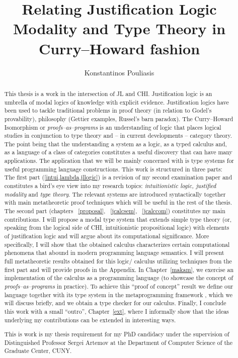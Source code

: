 \documentclass[12pt]{report}
\title{Relating Justification Logic Modality and Type Theory in Curry--Howard fashion}
\author{Konstantinos Pouliasis}
\begin{document}
\maketitle


\begin{abstract}
This thesis is a work in the intersection of \ac{JL} and \ac{CHI}. Justification logic is an umbrella of modal logics of knowledge with explicit evidence. 
Justification logics have been used to tackle traditional problems in proof theory (in relation to Godel's provability), philosophy (Gettier examples, Russel's barn paradox). 
The Curry--Howard Isomorphism or \emph{proofs--as--programs} is an understanding of logic that places logical studies in conjunction to type theory and -- in current developments -- 
category theory. The point being that the  understanding a system as a logic, as a typed calculus and, as a language of a class of categories constitutes a useful discovery 
that can have many applications.
The application that we will be mainly concerned with is type systems for useful programming language constructions. 
This work  is structured in three parts: 
The first part (\cref{intui,lambda,jllogic}) is a revision of my second examination paper and constitutes 
a bird's eye view into my 
research topics:  
\emph{intuitionistic logic, justified modality} and \emph{type theory}. 
The relevant systems are introduced syntactically together with main 
 metatheoretic proof techniques which will be useful 
in the rest of the thesis.
The second part (chapters ~\ref{proposal}, ~\ref{jcalcsem}, ~\ref{jcalccom}) 
constitutes my main contributions.
I will propose  
a modal type system that extends simple type theory
 (or, speaking from the logical side of \ac{CHI}, 
intuitionistic propositional logic) with elements of
 justification logic and will argue about its computational significance. 
 More specifically, I will show  
that the obtained calculus characterizes  certain 
computational phenomena that abound in modern programming language semantics. 
I will present full metatheoretic
results obtained for this logic/ calculus utilizing techniques from the first part 
and will provide proofs in the Appendix. 
In Chapter~\ref{makam}, we exercise an implementation of the calculus 
as a programming language (to showcase the concept of \emph{proofs--as--programs} in practice). To achieve this ``proof of concept'' result we define our 
language together with its type system
in the metaprogramming framework , which we will discuss briefly, 
and we obtain a type checker for our calculus. 
Finally, I conclude this work with a small ``outro'', Chapter~\ref{ext},
where I informally show that the ideas underlying my contributions 
can be extended in interesting ways.

This is work is my thesis requirement for my PhD candidacy under the supervision of Distinguished Professor Sergei Artemov at the Department of 
Computer Science of the Graduate Center, CUNY.
\end{abstract}
\end{document}
